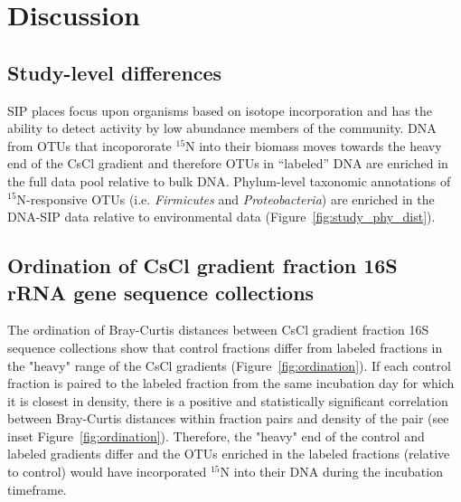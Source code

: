 \section{Discussion}
\subsection{Study-level differences}
SIP places focus upon organisms based on isotope incorporation and has the
ability to detect activity by low abundance members of the community.
DNA from OTUs that incopororate $^{15}$N into their biomass moves towards the
heavy end of the CsCl gradient and therefore OTUs in ``labeled'' DNA are
enriched in the full data pool relative to bulk DNA. Phylum-level taxonomic
annotations of $^{15}$N-responsive OTUs (i.e. \textit{Firmicutes} and
\textit{Proteobacteria})  are enriched in the DNA-SIP data relative to
environmental data (Figure~\ref{fig:study_phy_dist}).

\subsection{Ordination of CsCl gradient fraction 16S rRNA gene sequence collections} 
The ordination of Bray-Curtis distances between CsCl gradient fraction 16S
sequence collections show that control fractions differ from labeled fractions
in the "heavy" range of the CsCl gradients (Figure~\ref{fig:ordination}). If
each control fraction is paired to the labeled fraction from the same
incubation day for which it is closest in density, there is a positive and
statistically significant correlation between Bray-Curtis distances within
fraction pairs and density of the pair (see inset Figure~\ref{fig:ordination}).
Therefore, the "heavy" end of the control and labeled gradients differ and the
OTUs enriched in the labeled fractions (relative to control) would have
incorporated $^{15}$N into their DNA during the incubation timeframe.    

